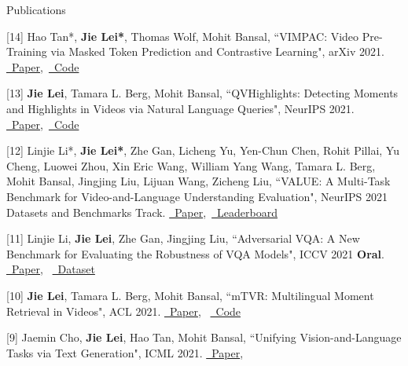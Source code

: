 \documentclass{resume} %
\begin{document}
\begin{rSection}{Publications}          
    \item {[14] Hao Tan*, \textbf{Jie Lei*}, Thomas Wolf, Mohit Bansal,
            ``VIMPAC: Video Pre-Training via Masked Token Prediction and Contrastive Learning",
            arXiv 2021. \href{http://arxiv.org/abs/2106.11250}{\color{codelinkcolor}\faFile~Paper},~\href{https://github.com/airsplay/vimpac}{\color{codelinkcolor}\faGithub~Code}
            }         
    \item {[13] \textbf{Jie Lei}, Tamara L. Berg, Mohit Bansal,
            ``QVHighlights: Detecting Moments and Highlights in Videos via Natural Language Queries",
            NeurIPS 2021. \href{https://arxiv.org/abs/2107.09609}{\color{codelinkcolor}\faFile~Paper},~\href{https://github.com/jayleicn/moment_detr}{\color{codelinkcolor}\faGithub~Code}
            }              
    \item {[12] Linjie Li*, \textbf{Jie Lei*}, Zhe Gan, Licheng Yu, Yen-Chun Chen, Rohit Pillai, Yu Cheng, Luowei Zhou, Xin Eric Wang, William Yang Wang, Tamara L. Berg, Mohit Bansal, Jingjing Liu, Lijuan Wang, Zicheng Liu,
            ``VALUE: A Multi-Task Benchmark for Video-and-Language Understanding Evaluation",
            NeurIPS 2021 Datasets and Benchmarks Track. \href{https://arxiv.org/abs/2106.04632}{\color{codelinkcolor}\faFile~Paper},~\href{https://value-leaderboard.github.io/}{\color{codelinkcolor}\faTrophy~Leaderboard}
            }            
    \item {[11] Linjie Li, \textbf{Jie Lei}, Zhe Gan, Jingjing Liu,
            ``Adversarial VQA: A New Benchmark for Evaluating the Robustness of VQA Models",
            ICCV 2021 {\color{bittersweet}\textbf{Oral}}. \href{https://arxiv.org/abs/2106.00245}{\color{codelinkcolor}\faFile~Paper},~
            \href{https://adversarialvqa.github.io/}{\color{codelinkcolor}\faDatabase~Dataset}
            }              
    \item {[10] \textbf{Jie Lei}, Tamara L. Berg, Mohit Bansal,
            ``mTVR: Multilingual Moment Retrieval in Videos",
            ACL 2021.
            \href{https://arxiv.org/abs/2108.00061}{\color{codelinkcolor}\faFile~Paper},~
            \href{https://github.com/jayleicn/mTVRetrieval}{\color{codelinkcolor}\faGithub~Code}
            }        
    \item {[9] Jaemin Cho, \textbf{Jie Lei}, Hao Tan, Mohit Bansal,
            ``Unifying Vision-and-Language Tasks via Text Generation",
            ICML 2021.    
            \href{https://arxiv.org/abs/2102.02779}{\color{codelinkcolor}\faFile~Paper},~
}
\end{rSection}
\end{document}
